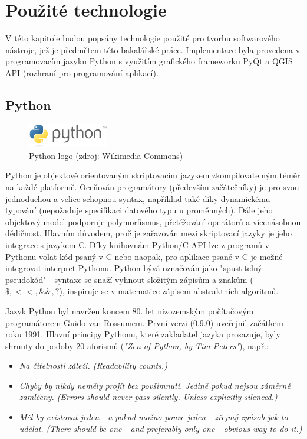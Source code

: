 \chapter{Použité technologie}
\label{3-technologie}

V této kapitole budou popsány technologie použité pro tvorbu softwarového nástroje, jež je předmětem této bakalářské práce. Implementace byla provedena v programovacím jazyku Python s využitím grafického frameworku PyQt a QGIS API (rozhraní pro programování aplikací).  

\section{Python}
\begin{figure}[H]
    \centering
      \includegraphics[width=100pt]{./pictures/python.png}
      \caption[Python logo]{Python logo (zdroj: Wikimedia Commons)}
      \label{fig:python}
\end{figure}
  
Python je objektově orientovaným skriptovacím jazykem zkompilovatelným téměr na každé platformě. Oceňován programátory (především začátečníky) je pro svou jednoduchou a velice schopnou syntax, například také díky dynamickému typování (nepožaduje specifikaci datového typu u proměnných). Dále jeho objektový model podporuje polymorfismus, přetěžování operátorů a vícenásobnou dědičnost. Hlavním důvodem, proč je zařazován mezi skriptovací jazyky je jeho integrace s jazykem C. Díky knihovnám Python/C API lze z programů v Pythonu volat kód psaný v C nebo naopak, pro aplikace psané v C je možné integrovat interpret Pythonu. 
Python bývá označován jako "spustitelný pseudokód" - syntaxe se snaží vyhnout složitým zápisům a znakům ($\$, <<, \&\&, ?$), inspiruje se v matematice zápisem abstraktních algoritmů.\cite{learningPython}

Jazyk Python byl navržen koncem 80. let nizozemským počítačovým programátorem Guido van Rossumem. První verzi (0.9.0) uveřejnil začátkem roku 1991. Hlavní principy Pythonu, které zakladatel jazyka prosazuje, byly shrnuty do podoby 20 aforismů (\textit{"Zen of Python, by Tim Peters"}), např.:

\begin{itemize}

	\item
		\textit{Na čitelnosti záleží. (Readability counts.)} 	
			
	\item
		\textit{Chyby by nikdy neměly projít bez povšimnutí. Jedině pokud nejsou záměrně zamlčeny. (Errors should never pass silently. Unless explicitly silenced.)}
		
	\item
		\textit{Měl by existovat jeden - a pokud možno pouze jeden - zřejmý způsob jak to udělat. (There should be one - and preferably only one - obvious way to do it.)}
\end{itemize}  

